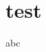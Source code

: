 \documentclass{beamer}
\begin{document}
\section{test}
\begin{frame}
    abc
\end{frame} 
\end{document}
